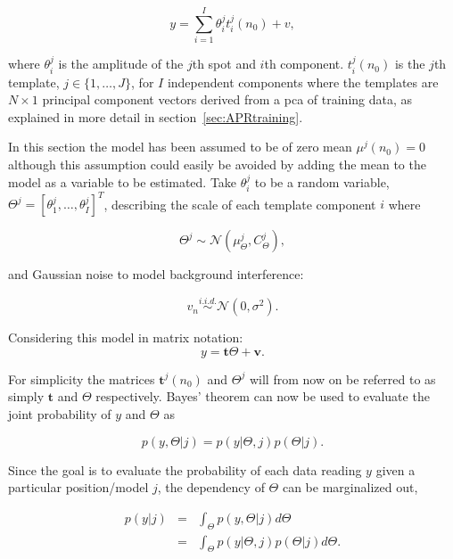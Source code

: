 \begin{equation}\label{eq:mod1}
y = \sum_{i=1}^{I} \theta_i^j t_i^j(n_0) + v,
\end{equation}

where $\theta_i^j$ is the amplitude of the $j$th spot and $i$th component. $t_i^j(n_0)$ is the $j$th template, $j \in \{1, \ldots ,J\}$, for $I$ independent components where the templates are $N \times 1$ principal component vectors derived from a \gls{pca} of training data, as explained in more detail in section~\ref{sec:APRtraining}.

In this section the model has been assumed to be of zero mean $\mu^j(n_0) =0$ although this assumption could easily be avoided by adding the mean to the model as a variable to be estimated. Take $\theta_i^j$ to be a random variable, $\Theta^j = [\theta_1^j,\ldots,\theta_I^j]^T$, describing the scale of each template component $i$ where

\begin{equation}\label{eq:theta}
\Theta^j \sim \mathcal{N}(\mu_{\Theta}^j,C_{\Theta}^j),
\end{equation}

and Gaussian noise to model background interference:

\begin{equation}\label{eq:noisePCA}
v_n \stackrel{i.i.d.}{\sim} \mathcal{N}(0,\sigma^2).
\end{equation}

Considering this model in matrix notation:
\begin{equation}\label{eq:mod2PCA}
y = \textbf{t}\Theta + \textbf{v}.
\end{equation}

For simplicity the matrices $\textbf{t}^j(n_0)$ and $\Theta^j$ will from now on be referred to as simply $\textbf{t}$ and $\Theta$ respectively.
Bayes' theorem can now be used to evaluate the joint probability of $y$ and $\Theta$ as

\begin{equation}\label{eq:bayes1}
p(y,\Theta | j) = p(y|\Theta,j)p(\Theta | j).
\end{equation}

Since the goal is to evaluate the probability of each data reading $y$ given a particular position/model $j$, the dependency of $\Theta$ can be marginalized out,

\begin{eqnarray}\nonumber
p(y|j) &=& \int_\Theta p(y,\Theta|j) d\Theta \\
\label{eq:marg1} &=& \int_\Theta p(y|\Theta,j)p(\Theta|j) d\Theta.
\end{eqnarray}

